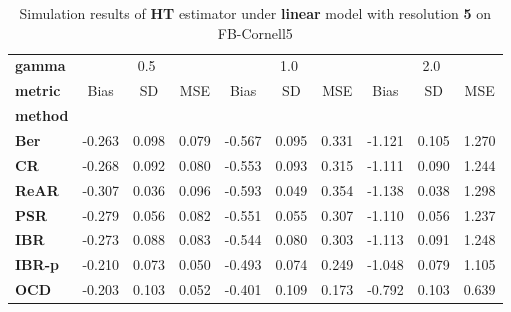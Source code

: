 \begin{table}
\centering
\caption{Simulation results of \textbf{HT} estimator under \textbf{linear} model with resolution \textbf{5} on FB-Cornell5}
\begin{tabular}{lccccccccc}
\toprule
\textbf{gamma} & \multicolumn{3}{c}{0.5} & \multicolumn{3}{c}{1.0} & \multicolumn{3}{c}{2.0} \\
\textbf{metric} &   Bias &     SD &    MSE &   Bias &     SD &    MSE &   Bias &     SD &    MSE \\
\textbf{method} &        &        &        &        &        &        &        &        &        \\
\midrule
\textbf{Ber} & -0.263 &  0.098 &  0.079 & -0.567 &  0.095 &  0.331 & -1.121 &  0.105 &  1.270 \\
\textbf{CR} & -0.268 &  0.092 &  0.080 & -0.553 &  0.093 &  0.315 & -1.111 &  0.090 &  1.244 \\
\textbf{ReAR} & -0.307 &  0.036 &  0.096 & -0.593 &  0.049 &  0.354 & -1.138 &  0.038 &  1.298 \\
\textbf{PSR} & -0.279 &  0.056 &  0.082 & -0.551 &  0.055 &  0.307 & -1.110 &  0.056 &  1.237 \\
\textbf{IBR} & -0.273 &  0.088 &  0.083 & -0.544 &  0.080 &  0.303 & -1.113 &  0.091 &  1.248 \\
\textbf{IBR-p} & -0.210 &  0.073 &  0.050 & -0.493 &  0.074 &  0.249 & -1.048 &  0.079 &  1.105 \\
\textbf{OCD} & -0.203 &  0.103 &  0.052 & -0.401 &  0.109 &  0.173 & -0.792 &  0.103 &  0.639 \\
\bottomrule
\end{tabular}
\end{table}
